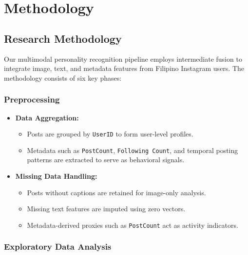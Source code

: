 \chapter{Methodology}
\label{sec:methodology}

\section{Research Methodology}

Our multimodal personality recognition pipeline employs intermediate fusion to integrate image, text, and metadata features from Filipino Instagram users. The methodology consists of six key phases:

\subsection{Preprocessing}
\label{subsec:preprocessing}

\begin{itemize}
	\item \textbf{Data Aggregation:}
	\begin{itemize}
		\item Posts are grouped by \texttt{UserID} to form user-level profiles.
		\item Metadata such as \texttt{PostCount}, \texttt{Following Count}, and temporal posting patterns are extracted to serve as behavioral signals.
	\end{itemize}
	
	\item \textbf{Missing Data Handling:}
	\begin{itemize}
		\item Posts without captions are retained for image-only analysis.
		\item Missing text features are imputed using zero vectors.
		\item Metadata-derived proxies such as \texttt{PostCount} act as activity indicators.
	\end{itemize}
\end{itemize}

\subsection{Exploratory Data Analysis}
\label{subsec:eda}

